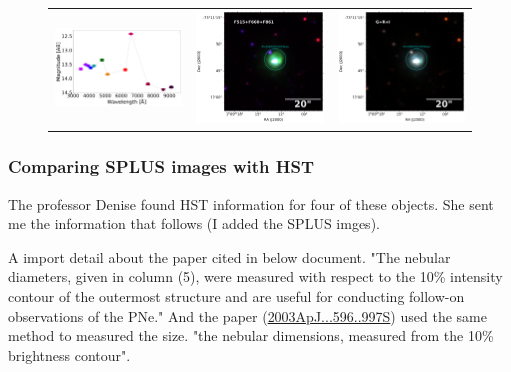 \documentclass[11pt]{article}
\begin{document}
\begin{figure}[!h]
\begin{tabular}{ccc}
\includegraphics[width=0.3\linewidth, clip]{photopectrum_splus_MC0116-191358_compat-HIIRegions-smc-match-splus_aper.pdf} & \includegraphics[width=0.3\linewidth, clip]{MC0116/MC0116_F861_191358-RGB-hii.pdf} & \includegraphics[width=0.3\linewidth, clip]{MC0116/MC0116_I_191358-RGB-hii.pdf} \\
 \end{tabular}
\caption{}
\end{figure}

\newpage
\subsubsection{Comparing SPLUS images with HST}
\label{sec:hst}
The professor Denise found HST information for four of these objects. She sent me the information that follows (I added the SPLUS imges).

A import detail about the paper cited in below document. "The nebular diameters, given in column (5), were measured with respect to the 10\% intensity contour of the outermost structure and are useful for conducting follow-on observations of the PNe." And the paper (\url{2003ApJ...596..997S}) used the same method to measured the size. "the nebular dimensions, measured from the 10\% brightness contour".


\end{document}
